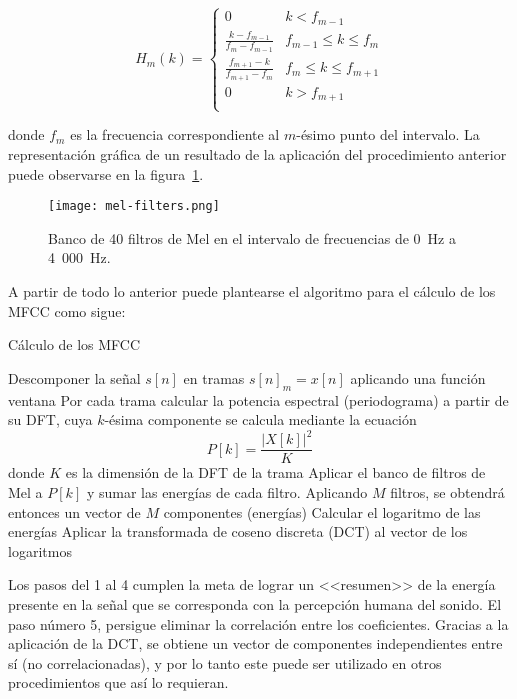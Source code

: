 \begin{equation}
    \label{eq:Mel filterbank}
    H_m(k) = \begin{cases}
                 0 & k < f_{m-1} \\
                 \frac{k-f_{m-1}}{f_m - f_{m-1}} & f_{m-1}\leq k\leq f_m \\
                 \frac{f_{m+1}-k}{f_{m+1}-f_m} & f_m \leq k\leq f_{m+1} \\
                 0 & k > f_{m+1} \\
    \end{cases}
\end{equation}

\noindent
donde $f_m$ es la frecuencia correspondiente al $m$-ésimo punto del intervalo.
La representación gráfica de un resultado de la aplicación del procedimiento anterior puede observarse en la figura~\ref{img:mel-filters}.

\begin{figure}[!h]
    \centering
    \texttt{[image: mel-filters.png]}
    \caption{Banco de 40 filtros de Mel en el intervalo de frecuencias de 0~Hz a 4~000~Hz.}
    \label{img:mel-filters}
\end{figure}

A partir de todo lo anterior puede plantearse el algoritmo para el cálculo de los MFCC como sigue:

\begin{algorithm}
    \caption{Cálculo de los MFCC}
    \label{algorithm:MFCC}
    Descomponer la señal $s[n]$ en tramas $s[n]_m = x[n]$ aplicando una función ventana\;
    Por cada trama calcular la potencia espectral (periodograma) a partir de su DFT, cuya $k$-ésima componente se calcula mediante la ecuación
    \begin{equation*}
        P[k] = \frac{|X[k]|^2}{K}
    \end{equation*}
    donde $K$ es la dimensión de la DFT de la trama\;
    Aplicar el banco de filtros de Mel a $P[k]$ y sumar las energías de cada filtro.
    Aplicando $M$ filtros, se obtendrá entonces un vector de $M$ componentes (energías)\;
    Calcular el logaritmo de las energías\;
    Aplicar la transformada de coseno discreta (DCT) al vector de los logaritmos\;
\end{algorithm}

Los pasos del 1 al 4 cumplen la meta de lograr un <<resumen>> de la energía presente en la señal que se corresponda con la percepción humana del sonido.
El paso número 5, persigue eliminar la correlación entre los coeficientes.
Gracias a la aplicación de la DCT, se obtiene un vector de componentes independientes entre sí (no correlacionadas), y por lo tanto este puede ser utilizado en otros procedimientos que así lo requieran.

